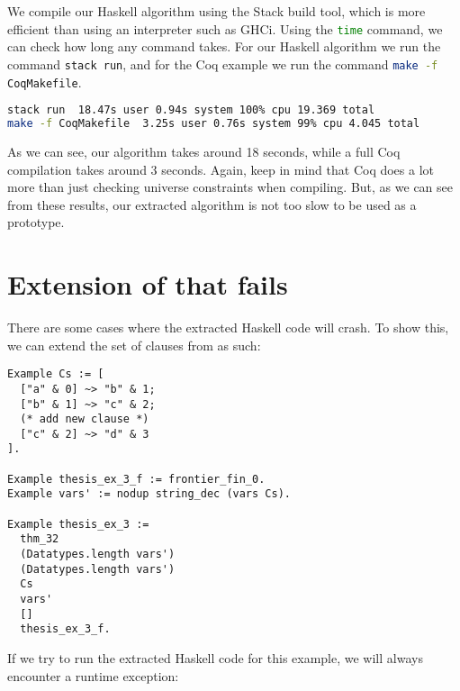 We compile our Haskell algorithm using the Stack build tool,
which is more efficient than using an interpreter such as GHCi.
Using the \lstinline[language=bash]{time} command, we can check how long
any command takes. For our Haskell algorithm we run the command \lstinline[language=bash]{stack run},
and for the Coq example we run the command \lstinline[language=bash]{make -f CoqMakefile}.

\begin{minipage}{\linewidth}
\begin{lstlisting}[language=bash, label={lst:real_world_example_bench}, caption={Real-world example benchmark}]
stack run  18.47s user 0.94s system 100% cpu 19.369 total
make -f CoqMakefile  3.25s user 0.76s system 99% cpu 4.045 total
\end{lstlisting}
\end{minipage}

As we can see, our algorithm takes around 18 seconds, while a full Coq compilation
takes around 3 seconds.
Again, keep in mind that Coq does a lot more than just checking universe constraints when
compiling. But, as we can see from these results, our extracted algorithm
is not too slow to be used as a prototype.

\section{Extension of  that fails}
\label{sec:limitations}

There are some cases where the extracted Haskell code will crash.
To show this, we can extend the set of clauses from  as such:

\begin{minipage}{\linewidth}
\begin{lstlisting}[language=Coq, label={lst:thm_32_coq_example_extended}, caption={\lstinline{thm_32} example extended}]
Example Cs := [
  ["a" & 0] ~> "b" & 1;
  ["b" & 1] ~> "c" & 2;
  (* add new clause *)
  ["c" & 2] ~> "d" & 3
].

Example thesis_ex_3_f := frontier_fin_0.
Example vars' := nodup string_dec (vars Cs).

Example thesis_ex_3 :=
  thm_32
  (Datatypes.length vars')
  (Datatypes.length vars')
  Cs
  vars'
  []
  thesis_ex_3_f.
\end{lstlisting}
\end{minipage}

If we try to run the extracted Haskell code for this example,
we will always encounter a runtime exception:

